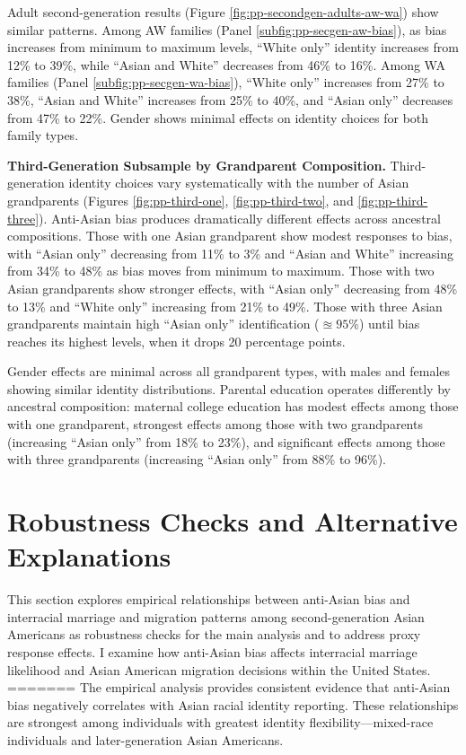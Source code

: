 Adult second-generation results (Figure \ref{fig:pp-secondgen-adults-aw-wa}) show similar patterns. Among AW families (Panel \ref{subfig:pp-secgen-aw-bias}), as bias increases from minimum to maximum levels, ``White only'' identity increases from 12\% to 39\%, while ``Asian and White'' decreases from 46\% to 16\%. Among WA families (Panel \ref{subfig:pp-secgen-wa-bias}), ``White only'' increases from 27\% to 38\%, ``Asian and White'' increases from 25\% to 40\%, and ``Asian only'' decreases from 47\% to 22\%. Gender shows minimal effects on identity choices for both family types.

\textbf{Third-Generation Subsample by Grandparent Composition.} Third-generation identity choices vary systematically with the number of Asian grandparents (Figures \ref{fig:pp-third-one}, \ref{fig:pp-third-two}, and \ref{fig:pp-third-three}). Anti-Asian bias produces dramatically different effects across ancestral compositions. Those with one Asian grandparent show modest responses to bias, with ``Asian only'' decreasing from 11\% to 3\% and ``Asian and White'' increasing from 34\% to 48\% as bias moves from minimum to maximum. Those with two Asian grandparents show stronger effects, with ``Asian only'' decreasing from 48\% to 13\% and ``White only'' increasing from 21\% to 49\%. Those with three Asian grandparents maintain high ``Asian only'' identification ($\approxeq 95\%$) until bias reaches its highest levels, when it drops 20 percentage points. 

Gender effects are minimal across all grandparent types, with males and females showing similar identity distributions. Parental education operates differently by ancestral composition: maternal college education has modest effects among those with one grandparent, strongest effects among those with two grandparents (increasing ``Asian only'' from 18\% to 23\%), and significant effects among those with three grandparents (increasing ``Asian only'' from 88\% to 96\%).

\section{Robustness Checks and Alternative Explanations}\label{sec:robcheck}

This section explores empirical relationships between anti-Asian bias and interracial marriage and migration patterns among second-generation Asian Americans as robustness checks for the main analysis and to address proxy response effects. I examine how anti-Asian bias affects interracial marriage likelihood and Asian American migration decisions within the United States.
=======
The empirical analysis provides consistent evidence that anti-Asian bias negatively correlates with Asian racial identity reporting. These relationships are strongest among individuals with greatest identity flexibility—mixed-race individuals and later-generation Asian Americans.

